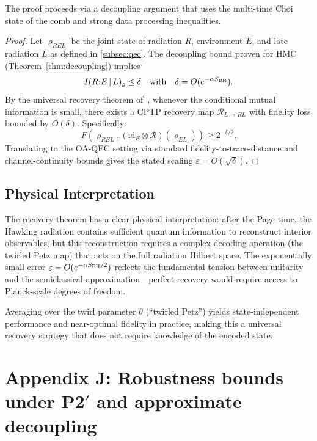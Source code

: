 \documentclass[a4paper,11pt]{article}
\newcommand{\HMC}{\textup{\textsc{HMC}}\xspace}
\theoremstyle{plain}
\theoremstyle{definition}
\theoremstyle{remark}
\begin{document}
The proof proceeds via a decoupling argument that uses the multi-time Choi state of the comb and strong data processing inequalities.

\begin{proof}
Let $\varrho_{REL}$ be the joint state of radiation $R$, environment $E$, and late radiation $L$ as defined in \cref{subsec:qec}. The decoupling bound proven for \HMC{} (Theorem~\ref{thm:decoupling}) implies 
\[
I(R{:}E\,|\,L)_{\varrho}\le \delta \quad \text{with} \quad \delta=O(e^{-\alpha S_{\rm BH}}).
\]
By the universal recovery theorem of~\citet{FawziRenner:2015}, whenever the conditional mutual information is small, there exists a CPTP recovery map $\mathcal{R}_{L\to RL}$ with fidelity loss bounded by $O(\delta)$. Specifically:
\[
F(\varrho_{REL}, (\mathrm{id}_E \otimes \mathcal{R})(\varrho_{EL})) \geq 2^{-\delta/2}.
\]
Translating to the OA-QEC setting via standard fidelity-to-trace-distance and channel-continuity bounds gives the stated scaling $\varepsilon=O(\sqrt{\delta})$.
\end{proof}

\subsection{Physical Interpretation}
The recovery theorem has a clear physical interpretation: after the Page time, the Hawking radiation contains sufficient quantum information to reconstruct interior observables, but this reconstruction requires a complex decoding operation (the twirled Petz map) that acts on the full radiation Hilbert space. The exponentially small error $\varepsilon = O(e^{-\alpha S_{\rm BH}/2})$ reflects the fundamental tension between unitarity and the semiclassical approximation---perfect recovery would require access to Planck-scale degrees of freedom.

Averaging over the twirl parameter $\theta$ (``twirled Petz'') yields state-independent performance and near-optimal fidelity in practice, making this a universal recovery strategy that does not require knowledge of the encoded state.

\section{Appendix J: Robustness bounds under \texorpdfstring{P2$'$}{P2'} and approximate decoupling}
\label{app:robustness}
\end{document}
